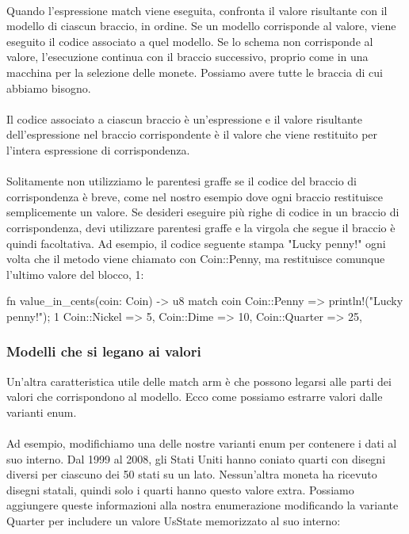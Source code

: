 \documentclass[11pt,a4paper]{article}
\begin{document}
\\
Quando l'espressione match viene eseguita, confronta il valore risultante con il modello di ciascun braccio, in ordine. Se un modello corrisponde al valore, viene eseguito il codice associato a quel modello. Se lo schema non corrisponde al valore, l’esecuzione continua con il braccio successivo, proprio come in una macchina per la selezione delle monete. Possiamo avere tutte le braccia di cui abbiamo bisogno.\\
\\
Il codice associato a ciascun braccio è un'espressione e il valore risultante dell'espressione nel braccio corrispondente è il valore che viene restituito per l'intera espressione di corrispondenza.\\
\\
Solitamente non utilizziamo le parentesi graffe se il codice del braccio di corrispondenza è breve, come nel nostro esempio dove ogni braccio restituisce semplicemente un valore. Se desideri eseguire più righe di codice in un braccio di corrispondenza, devi utilizzare parentesi graffe e la virgola che segue il braccio è quindi facoltativa. Ad esempio, il codice seguente stampa "Lucky penny!" ogni volta che il metodo viene chiamato con Coin::Penny, ma restituisce comunque l'ultimo valore del blocco, 1:
\begin{rust}
fn value_in_cents(coin: Coin) -> u8 {
    match coin {
        Coin::Penny => {
            println!("Lucky penny!");
            1
        }
        Coin::Nickel => 5,
        Coin::Dime => 10,
        Coin::Quarter => 25,
    }
}
\end{rust}

\subsubsection{Modelli che si legano ai valori}
Un'altra caratteristica utile delle match arm è che possono legarsi alle parti dei valori che corrispondono al modello. Ecco come possiamo estrarre valori dalle varianti enum.\\
\\
Ad esempio, modifichiamo una delle nostre varianti enum per contenere i dati al suo interno. Dal 1999 al 2008, gli Stati Uniti hanno coniato quarti con disegni diversi per ciascuno dei 50 stati su un lato. Nessun'altra moneta ha ricevuto disegni statali, quindi solo i quarti hanno questo valore extra. Possiamo aggiungere queste informazioni alla nostra enumerazione modificando la variante Quarter per includere un valore UsState memorizzato al suo interno:
\end{document}
